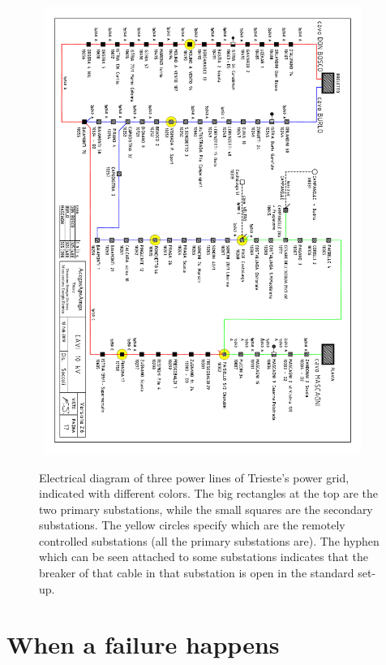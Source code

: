 \begin{figure}[pt]
    \centering
    \mbox{
        \hspace*{20pt}  %
        \includegraphics[width=0.92\textwidth, angle=90, center]{chapters/figures/Mastrino.pdf}
    }
    \caption{Electrical diagram of three power lines of Trieste's power grid, indicated with different colors. The big rectangles at the top are the two primary substations, while the small squares are the secondary substations. The yellow circles specify which are the remotely controlled substations (all the primary substations are). The hyphen which can be seen attached to some substations indicates that the breaker of that cable in that substation is open in the standard set-up.}
    \label{fig:mastrino}
\end{figure}


\section{When a failure happens} %

